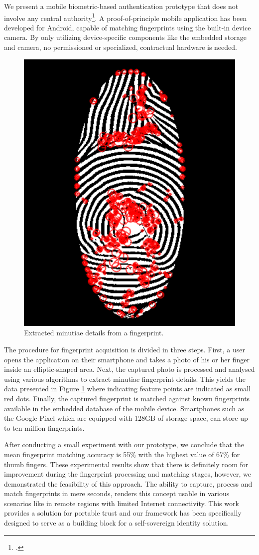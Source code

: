 \documentclass[USenglish]{article}
\begin{document}
We present a mobile biometric-based authentication prototype that does not involve any central authority\footcite{hammudoglu2017portable}.
A proof-of-principle mobile application has been developed for Android, capable of matching fingerprints using the built-in device camera.
By only utilizing device-specific components like the embedded storage and camera, no permissioned or specialized, contractual hardware is needed.

\begin{figure}[t]
	\centering
	\includegraphics[width=.5\columnwidth]{assets/fingerprint}
	\caption{Extracted minutiae details from a fingerprint.}
	\label{fig:fingerprint}
\end{figure}

The procedure for fingerprint acquisition is divided in three steps.
First, a user opens the application on their smartphone and takes a photo of his or her finger inside an elliptic-shaped area.
Next, the captured photo is processed and analysed using various algorithms to extract minutiae fingerprint details.
This yields the data presented in Figure \ref{fig:fingerprint} where indicating feature points are indicated as small red dots.
Finally, the captured fingerprint is matched against known fingerprints available in the embedded database of the mobile device.
Smartphones such as the Google Pixel which are equipped with 128GB of storage space, can store up to ten million fingerprints.

After conducting a small experiment with our prototype, we conclude that the mean fingerprint matching accuracy is 55\% with the highest value of 67\% for thumb fingers.
These experimental results show that there is definitely room for improvement during the fingerprint processing and matching stages, however, we demonstrated the feasibility of this approach.
The ability to capture, process and match fingerprints in mere seconds, renders this concept usable in various scenarios like in remote regions with limited Internet connectivity.
This work provides a solution for portable trust and our framework has been specifically designed to serve as a building block for a self-sovereign identity solution.
\end{document}
